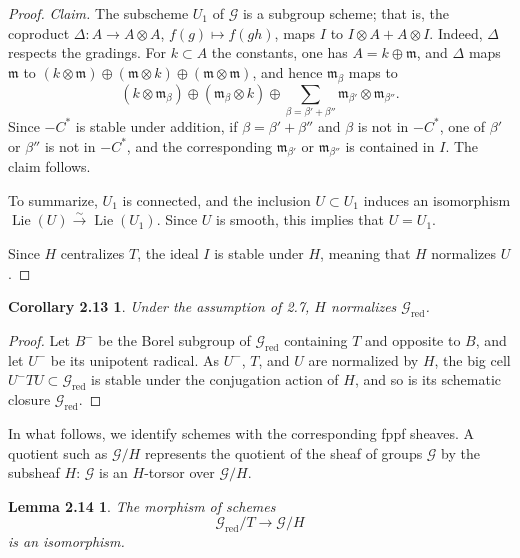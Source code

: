 \documentclass[11pt]{article}
\newcommand{\Lie}{\operatorname{Lie}}
\newcommand{\red}{\mathrm{red}}
\newtheorem*{corollary213}{Corollary 2.13}
\newtheorem*{lemma214}{Lemma 2.14}
\begin{document}
\begin{proof}
\emph{Claim.} The subscheme \(U_1\) of \(\mathcal G\) is a subgroup scheme; that is,
the coproduct \(\Delta:A\to A\otimes A\), \(f(g)\mapsto f(gh)\), maps \(I\) to
\(I\otimes A+A\otimes I\). Indeed, \(\Delta\) respects the gradings. For \(k\subset A\)
the constants, one has \(A=k\oplus\mathfrak m\), and \(\Delta\) maps
\(\mathfrak m\) to
\((k\otimes\mathfrak m)\oplus(\mathfrak m\otimes k)\oplus
(\mathfrak m\otimes\mathfrak m)\), and hence \(\mathfrak m_\beta\) maps to
\begin{equation}
(k\otimes\mathfrak m_\beta)\oplus(\mathfrak m_\beta\otimes k)
\oplus
\sum_{\beta=\beta'+\beta''} \mathfrak m_{\beta'}\otimes\mathfrak m_{\beta''}.
\tag{2.12.3}
\end{equation}
Since \(-C^*\) is stable under addition, if \(\beta=\beta'+\beta''\) and \(\beta\) is
not in \(-C^*\), one of \(\beta'\) or \(\beta''\) is not in \(-C^*\), and the
corresponding \(\mathfrak m_{\beta'}\) or \(\mathfrak m_{\beta''}\) is contained in
\(I\). The claim follows.

To summarize, \(U_1\) is connected, and the inclusion \(U\subset U_1\) induces an
isomorphism \(\Lie(U)\xrightarrow{\sim}\Lie(U_1)\). Since \(U\) is smooth, this
implies that \(U=U_1\).

Since \(H\) centralizes \(T\), the ideal \(I\) is stable under \(H\), meaning that \(H\)
normalizes \(U\).
\end{proof}

\begin{corollary213}
Under the assumption of 2.7, \(H\) normalizes \(\mathcal G_{\red}\).
\end{corollary213}

\begin{proof}
Let \(B^-\) be the Borel subgroup of \(\mathcal G_{\red}\) containing \(T\) and
opposite to \(B\), and let \(U^-\) be its unipotent radical. As \(U^-\), \(T\), and
\(U\) are normalized by \(H\), the big cell \(U^-TU\subset \mathcal G_{\red}\) is
stable under the conjugation action of \(H\), and so is its schematic closure
\(\mathcal G_{\red}\).
\end{proof}

In what follows, we identify schemes with the corresponding fppf sheaves. A quotient
such as \(\mathcal G/H\) represents the quotient of the sheaf of groups \(\mathcal G\)
by the subsheaf \(H\): \(\mathcal G\) is an \(H\)-torsor over \(\mathcal G/H\).

\begin{lemma214}
The morphism of schemes
\begin{equation}
  \mathcal G_{\red}/T\longrightarrow \mathcal G/H
  \tag{2.14.1}
\end{equation}
is an isomorphism.
\end{lemma214}
\end{document}
